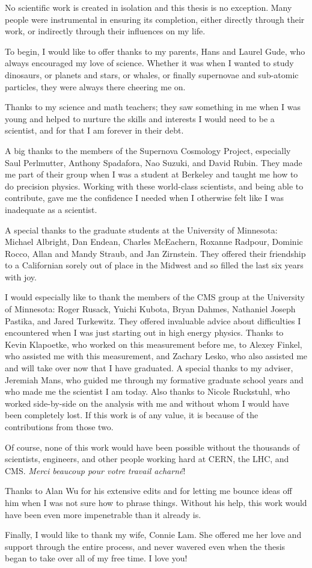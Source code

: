 No scientific work is created in isolation and this thesis is no exception.
Many people were instrumental in ensuring its completion, either directly
through their work, or indirectly through their influences on my life.

To begin, I would like to offer thanks to my parents, Hans and Laurel Gude, who
always encouraged my love of science. Whether it was when I wanted to study
dinosaurs, or planets and stars, or whales, or finally supernovae and
sub-atomic particles, they were always there cheering me on.

Thanks to my science and math teachers; they saw something in me when I was
young and helped to nurture the skills and interests I would need to be a
scientist, and for that I am forever in their debt.

A big thanks to the members of the Supernova Cosmology Project, especially Saul
Perlmutter, Anthony Spadafora, Nao Suzuki, and David Rubin. They made me part
of their group when I was a student at Berkeley and taught me how to do
precision physics. Working with these world-class scientists, and being able to
contribute, gave me the confidence I needed when I otherwise felt like I was
inadequate as a scientist.

A special thanks to the graduate students at the University of Minnesota:
Michael Albright, Dan Endean, Charles McEachern, Roxanne Radpour, Dominic
Rocco, Allan and Mandy Straub, and Jan Zirnstein. They offered their friendship
to a Californian sorely out of place in the Midwest and so filled the last six
years with joy.

I would especially like to thank the members of the CMS group at the University
of Minnesota: Roger Rusack, Yuichi Kubota, Bryan Dahmes, Nathaniel Joseph
Pastika, and Jared Turkewitz. They offered invaluable advice about difficulties
I encountered when I was just starting out in high energy physics. Thanks to
Kevin Klapoetke, who worked on this measurement before me, to Alexey Finkel,
who assisted me with this measurement, and Zachary Lesko, who also assisted me
and will take over now that I have graduated. A special thanks to my adviser,
Jeremiah Mans, who guided me through my formative graduate school years and who
made me the scientist I am today. Also thanks to Nicole Ruckstuhl, who worked
side-by-side on the analysis with me and without whom I would have been
completely lost. If this work is of any value, it is because of the
contributions from those two.

Of course, none of this work would have been possible without the thousands of
scientists, engineers, and other people working hard at CERN, the LHC, and CMS.
\textit{Merci beaucoup pour votre travail acharn\'{e}}!

Thanks to Alan Wu for his extensive edits and for letting me bounce ideas off
him when I was not sure how to phrase things. Without his help, this work would
have been even more impenetrable than it already is.

Finally, I would like to thank my wife, Connie Lam. She offered me her love and
support through the entire process, and never wavered even when the thesis
began to take over all of my free time. I love you!
